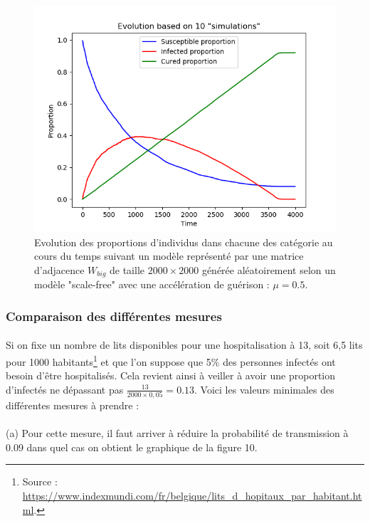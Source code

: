 \documentclass[a4paper, 12pt, oneside]{article}
\begin{document}
\begin{figure}[H]
	\centering
	\includegraphics[scale=1]{Wbig_dense_speeded_heal.png} 
	\caption{Evolution des proportions d'individus dans chacune des catégorie au cours du temps suivant un modèle représenté par une matrice d'adjacence $W_{big}$ de taille $2000 \times 2000$ générée aléatoirement selon un modèle "scale-free" avec une accélération de guérison : $\mu = 0.5$.}
\end{figure}

\subsubsection{Comparaison des différentes mesures}

\paragraph{}Si on fixe un nombre de lits disponibles pour une hospitalisation à 13, soit 6,5 lits pour 1000 habitants\footnote{Source : \url{https://www.indexmundi.com/fr/belgique/lits_d_hopitaux_par_habitant.html}.} et que l'on suppose que 5\% des personnes infectés ont besoin d'être hospitalisés. Cela revient ainsi à veiller à avoir une proportion d'infectés ne dépassant pas $\frac{13}{2000 \times 0,05} = 0.13$. Voici les valeurs minimales des différentes mesures à prendre :

\paragraph{}(a) Pour cette mesure, il faut arriver à réduire la probabilité de transmission à 0.09 dans quel cas on obtient le graphique de la figure 10.
\end{document}
